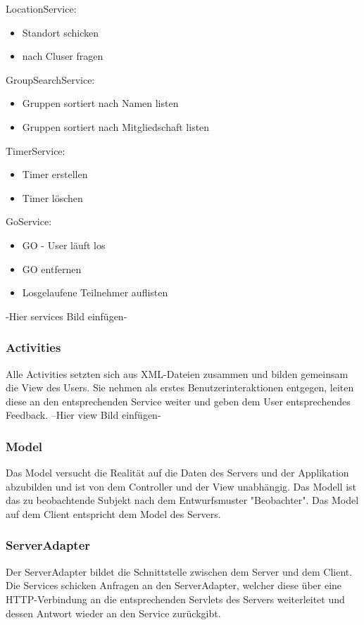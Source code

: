 LocationService:
\begin{itemize}
\item Standort schicken
\item nach Cluser fragen
\end{itemize}
GroupSearchService:
\begin{itemize}
\item Gruppen sortiert nach Namen listen
\item Gruppen sortiert nach Mitgliedschaft listen
\end{itemize}
TimerService:
\begin{itemize}
\item Timer erstellen
\item Timer löschen
\end{itemize}
GoService:
\begin{itemize}
\item GO - User läuft los
\item GO entfernen
\item Losgelaufene Teilnehmer auflisten
\end{itemize}
-Hier services Bild einfügen-

	\subsubsection{Activities}
	Alle Activities setzten sich aus XML-Dateien zusammen und bilden gemeinsam die View des Users.
Sie nehmen als erstes Benutzerinteraktionen entgegen, leiten diese an den entsprechenden Service weiter und geben dem User entsprechendes Feedback.
	--Hier view Bild einfügen-
	\subsubsection{Model}
Das Model versucht die Realität auf die Daten des Servers und der Applikation abzubilden und ist von dem Controller und der View unabhängig. Das Modell ist das zu beobachtende Subjekt nach dem Entwurfsmuster "Beobachter".
Das Model auf dem Client entspricht dem Model des Servers.
	\subsubsection{ServerAdapter}
	Der ServerAdapter bildet die Schnittstelle zwischen dem Server und dem Client. Die Services schicken Anfragen an den ServerAdapter, welcher diese über eine HTTP-Verbindung an die entsprechenden Servlets des Servers weiterleitet und dessen Antwort wieder an den Service zurückgibt.


	\newpage
